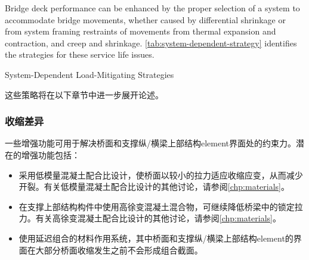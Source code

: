 Bridge deck performance can be enhanced by the proper selection of a system to accommodate bridge movements, whether caused by differential shrinkage or from system framing restraints of movements from thermal expansion and contraction, and creep and shrinkage. \cref{tab:system-dependent-strategy} identifies the strategies for these service life issues.

\begin{table}
  \caption{System-Dependent Load-Mitigating Strategies}
  \label{tab:system-dependent-strategy}
\end{table}

这些策略将在以下章节中进一步展开论述。

\subsubsection{收缩差异}
\label{subsubsec:diffential-shrinkage}
一些增强功能可用于解决桥面和支撑纵/横梁上部结构\gls*{element}界面处的约束力。潜在的增强功能包括：
\begin{itemize}
  \item 采用低模量混凝土配合比设计，使桥面以较小的拉力适应收缩应变，从而减少开裂。有关低模量混凝土配合比设计的其他讨论，请参阅\cref{chp:materials}。
  \item 在支撑上部结构构件中使用高徐变混凝土混合物，可继续降低桥梁中的锁定拉力。有关高徐变混凝土配合比设计的其他讨论，请参阅\cref{chp:materials}。
  \item 使用延迟组合的材料作用系统，其中桥面和支撑纵/横梁上部结构\gls*{element}的界面在大部分桥面收缩发生之前不会形成组合截面。
\end{itemize}

